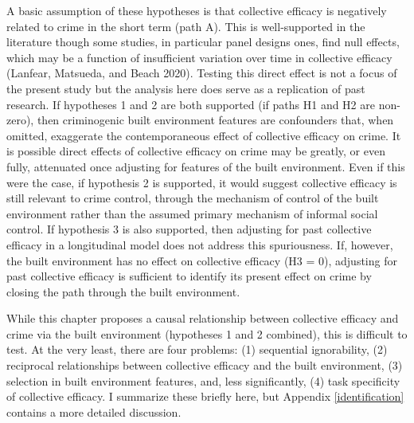 \documentclass [11pt, proquest] {uwthesis}[2015/03/03]
\begin{document}
A basic assumption of these hypotheses is that collective efficacy is negatively related to crime in the short term (path A). This is well-supported in the literature though some studies, in particular panel designs ones, find null effects, which may be a function of insufficient variation over time in collective efficacy (Lanfear, Matsueda, and Beach 2020). Testing this direct effect is not a focus of the present study but the analysis here does serve as a replication of past research. If hypotheses 1 and 2 are both supported (if paths H1 and H2 are non-zero), then criminogenic built environment features are confounders that, when omitted, exaggerate the contemporaneous effect of collective efficacy on crime. It is possible direct effects of collective efficacy on crime may be greatly, or even fully, attenuated once adjusting for features of the built environment. Even if this were the case, if hypothesis 2 is supported, it would suggest collective efficacy is still relevant to crime control, through the mechanism of control of the built environment rather than the assumed primary mechanism of informal social control. If hypothesis 3 is also supported, then adjusting for past collective efficacy in a longitudinal model does not address this spuriousness. If, however, the built environment has no effect on collective efficacy (H3 = 0), adjusting for past collective efficacy is sufficient to identify its present effect on crime by closing the path through the built environment.

While this chapter proposes a causal relationship between collective efficacy and crime via the built environment (hypotheses 1 and 2 combined), this is difficult to test. At the very least, there are four problems: (1) sequential ignorability, (2) reciprocal relationships between collective efficacy and the built environment, (3) selection in built environment features, and, less significantly, (4) task specificity of collective efficacy. I summarize these briefly here, but Appendix \ref{identification} contains a more detailed discussion.
\end{document}
